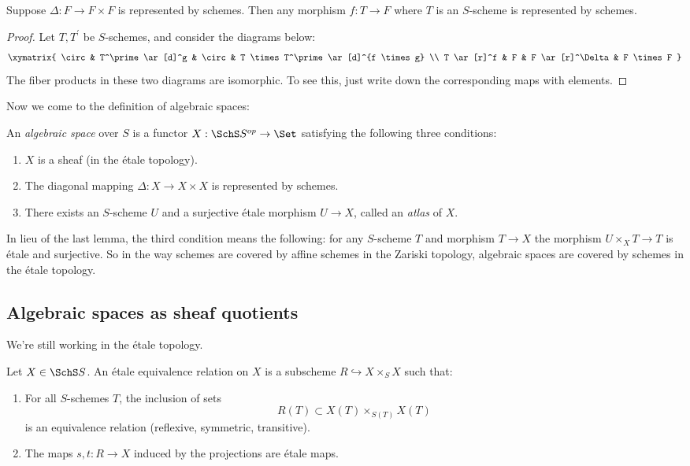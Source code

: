 \documentclass[11pt, english]{article}
\begin{document}
\begin{lemma}
Suppose $\Delta:F \to F \times F$ is represented by schemes. Then any morphism $f:T \to F$ where $T$ is an $S$-scheme is represented by schemes. 
\end{lemma}
\begin{proof}
Let $T,T^\prime$ be $S$-schemes, and consider the diagrams below:
\[
\xymatrix{
\circ & T^\prime \ar[d]^g & \circ & T \times T^\prime \ar[d]^{f \times g} \\
T \ar[r]^f & F & F \ar[r]^\Delta & F \times F
}
\]
The fiber products in these two diagrams are isomorphic. To see this, just write down the corresponding maps with elements.
\end{proof}

Now we come to the definition of algebraic spaces:
\begin{defi}
An \emph{algebraic space} over $S$ is a functor $X:\SchS S^{op} \to \Set$ satisfying the following three conditions:
\begin{enumerate}
\item $X$ is a sheaf (in the étale topology).
\item The diagonal mapping $\Delta:X \to X \times X$ is represented by schemes.
\item There exists an $S$-scheme $U$ and a surjective étale morphism $U \to X$, called an \emph{atlas} of $X$.
\end{enumerate}
\end{defi}

\begin{remark}
In lieu of the last lemma, the third condition means the following: for any $S$-scheme $T$ and morphism $T \to X$ the morphism $U \times_X T \to T$ is étale and surjective. So in the way schemes are covered by affine schemes in the Zariski topology, algebraic spaces are covered by schemes in the étale topology.
\end{remark}

\subsection{Algebraic spaces as sheaf quotients}

We're still working in the étale topology.

\begin{defi}
Let $X \in \SchS S$. An étale equivalence relation on $X$ is a subscheme $R \hookrightarrow X \times_S X$ such that:
\begin{enumerate}
\item For all $S$-schemes $T$, the inclusion of sets
\[
R(T) \subset X(T) \times_{S(T)} X(T)
\]
is an equivalence relation (reflexive, symmetric, transitive).
\item The maps $s,t:R \to X$ induced by the projections are étale maps.
\end{enumerate}
\end{defi}
\end{document}
